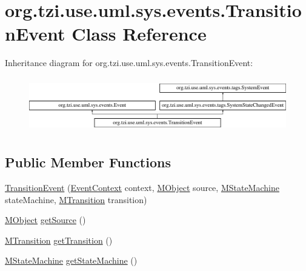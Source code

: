 \hypertarget{classorg_1_1tzi_1_1use_1_1uml_1_1sys_1_1events_1_1_transition_event}{\section{org.\-tzi.\-use.\-uml.\-sys.\-events.\-Transition\-Event Class Reference}
\label{classorg_1_1tzi_1_1use_1_1uml_1_1sys_1_1events_1_1_transition_event}
}
Inheritance diagram for org.\-tzi.\-use.\-uml.\-sys.\-events.\-Transition\-Event\-:\begin{figure}[H]
\begin{center}
\leavevmode
\includegraphics[height=2.413793cm]{classorg_1_1tzi_1_1use_1_1uml_1_1sys_1_1events_1_1_transition_event}
\end{center}
\end{figure}
\subsection*{Public Member Functions}
\begin{DoxyCompactItemize}
\item 
\hyperlink{classorg_1_1tzi_1_1use_1_1uml_1_1sys_1_1events_1_1_transition_event_a32f0a73115a723df5c0f5d813e4c8fa0}{Transition\-Event} (\hyperlink{enumorg_1_1tzi_1_1use_1_1uml_1_1sys_1_1events_1_1tags_1_1_event_context}{Event\-Context} context, \hyperlink{interfaceorg_1_1tzi_1_1use_1_1uml_1_1sys_1_1_m_object}{M\-Object} source, \hyperlink{classorg_1_1tzi_1_1use_1_1uml_1_1mm_1_1statemachines_1_1_m_state_machine}{M\-State\-Machine} state\-Machine, \hyperlink{classorg_1_1tzi_1_1use_1_1uml_1_1mm_1_1statemachines_1_1_m_transition}{M\-Transition} transition)
\item 
\hyperlink{interfaceorg_1_1tzi_1_1use_1_1uml_1_1sys_1_1_m_object}{M\-Object} \hyperlink{classorg_1_1tzi_1_1use_1_1uml_1_1sys_1_1events_1_1_transition_event_a5d81f4bb00d9a727d342b482bfea0ca3}{get\-Source} ()
\item 
\hyperlink{classorg_1_1tzi_1_1use_1_1uml_1_1mm_1_1statemachines_1_1_m_transition}{M\-Transition} \hyperlink{classorg_1_1tzi_1_1use_1_1uml_1_1sys_1_1events_1_1_transition_event_ac353495912fb93e3689f8c7eaccce6ad}{get\-Transition} ()
\item 
\hyperlink{classorg_1_1tzi_1_1use_1_1uml_1_1mm_1_1statemachines_1_1_m_state_machine}{M\-State\-Machine} \hyperlink{classorg_1_1tzi_1_1use_1_1uml_1_1sys_1_1events_1_1_transition_event_acbbe4312220eceb49d49251baede6d78}{get\-State\-Machine} ()
\end{DoxyCompactItemize}


